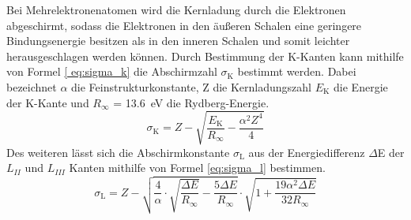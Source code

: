 Bei Mehrelektronenatomen wird die Kernladung durch die Elektronen abgeschirmt, sodass die Elektronen in den äußeren Schalen eine geringere Bindungsenergie besitzen als in den inneren Schalen und somit leichter herausgeschlagen werden können. Durch Bestimmung der K-Kanten kann mithilfe von Formel \eqref{ eq:sigma_k} die Abschirmzahl $\sigma_\text{K}$ bestimmt werden. Dabei bezeichnet $\alpha$ die Feinstrukturkonstante, Z die Kernladungszahl $E_\text{K}$ die Energie der K-Kante und $R_\infty$ = \SI{13.6}{\electronvolt} die Rydberg-Energie.
%
\begin{equation}
\sigma_\text{K} = Z - \sqrt{\frac{E_\text{K}}{R_\infty} - \frac{\alpha^2 Z^4}{4}}
\label{ eq:sigma_k}
\end{equation}
% 
Des weiteren lässt sich die Abschirmkonstante $\sigma_\text{L}$ aus der Energiedifferenz $\Delta$E der $L_{II}$ und $L_{III}$ Kanten mithilfe von Formel \eqref{eq:sigma_l} bestimmen.
%
\begin{equation}
\sigma_\text{L} = Z - \sqrt{\frac{4}{\alpha} \cdot \sqrt{\frac{\Delta E}{R_\infty}} - \frac{5 \Delta E}{R_\infty}} \cdot \sqrt{ 1 + \frac{19 \alpha ^2 \Delta E}{32 R_\infty}}
\label{eq:sigma_l}
\end{equation}
%